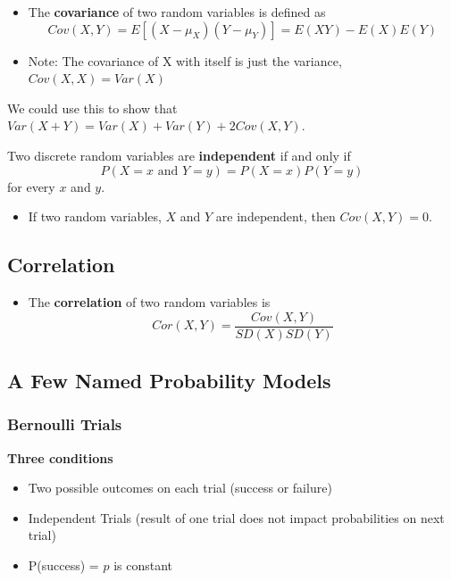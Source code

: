 \documentclass[]{book}
\providecommand{\tightlist}{%
  \setlength{\itemsep}{0pt}\setlength{\parskip}{0pt}}
\begin{document}
\begin{itemize}
\item
  The \textbf{covariance} of two random variables is defined as
  \[Cov(X,Y) = E[(X - \mu_X)(Y - \mu_Y)] = E(XY) - E(X)E(Y)\]
\item
  Note: The covariance of X with itself is just the variance, \(Cov(X,X) = Var(X)\)
\end{itemize}

We could use this to show that \(Var(X+Y) = Var(X)+ Var(Y) + 2Cov(X,Y)\).

Two discrete random variables are \textbf{independent} if and only if
\[P(X = x\text{ and } Y = y)  = P(X=x)P(Y=y)\]
for every \(x\) and \(y\).

\begin{itemize}
\tightlist
\item
  If two random variables, \(X\) and \(Y\) are independent, then \(Cov(X,Y)= 0\).
\end{itemize}

\hypertarget{correlation}{%
\subsection{Correlation}\label{correlation}}

\begin{itemize}
\tightlist
\item
  The \textbf{correlation} of two random variables is
  \[Cor(X,Y) =\frac{Cov(X,Y)}{SD(X)SD(Y)}\]
\end{itemize}

\hypertarget{a-few-named-probability-models}{%
\subsection{A Few Named Probability Models}\label{a-few-named-probability-models}}

\hypertarget{bernoulli-trials}{%
\subsubsection{Bernoulli Trials}\label{bernoulli-trials}}

\textbf{Three conditions}

\begin{itemize}
\tightlist
\item
  Two possible outcomes on each trial (success or failure)
\item
  Independent Trials (result of one trial does not impact probabilities on next trial)
\item
  P(success) = \(p\) is constant
\end{itemize}
\end{document}
